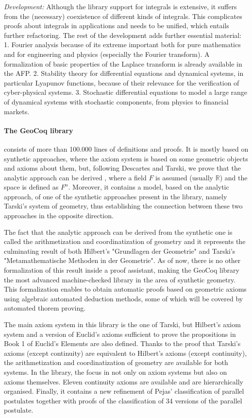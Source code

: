 \emph{Development:}
Although the library support for integrals is extensive, it suffers
from the (necessary) coexistence of different kinds of
integrals. This complicates proofs about integrals in applications and needs
to be unified, which entails further refactoring. The rest of the
development adds further essential material:
1. Fourier analysis because of its extreme important both for pure mathematics and for
engineering and physics (especially the Fourier
transform). A formalization of basic properties of the Laplace transform is already available in the AFP. 2. Stability theory for differential equations and
dynamical systems, in particular Lyapunov functions, because of their
relevance for the verification of cyber-physical systems.
3. Stochastic differential equations to model a large range of
dynamical systems with stochastic components, from physics to financial markets.

\paragraph*{The GeoCoq library}
consists of more than 100.000 lines of definitions and proofs. It is
mostly based on synthetic approaches, where the axiom system is based
on some geometric objects and axioms about them, but, following
Descartes and Tarski, we prove that the analytic approach can be
derived , where a field $F$ is assumed (usually $\mathbb{R}$) and the space is
defined as $F^n$. Moreover, it contains a model, based on the analytic
approach, of one of the synthetic approaches present in the library,
namely Tarski's system of geometry, thus establishing the connection
between these two approaches in the opposite direction.

The fact that the analytic approach can be derived from the synthetic
one is called the arithmetization and coordinatization of geometry and
it represents the culminating result of both Hilbert's "Grundlagen der
Geometrie" and Tarski's "Metamathematische Methoden in der
Geometrie". As of now, there is no other formalization of this result
inside a proof assistant, making the GeoCoq library the most advanced
machine-checked library in the area of synthetic geometry. This
formalization enables to obtain automatic proofs based on geometric
axioms using algebraic automated deduction methods, some of which will
be covered by automated thorem proving.

The main axiom system in this library is the one of Tarski, but
Hilbert's axiom system and a version of Euclid's axioms sufficient to
prove the propositions in Book 1 of Euclid's Elements are also
defined. Thanks to the proof that Tarski's axioms (except continuity)
are equivalent to Hilbert's axioms (except continuity), the
arithmetization and coordinatization of geometry are available for
both systems. In the library, the focus in not only on axiom systems
but also on axioms themselves. Eleven continuity axioms are available
and are hierarchically organised. Finally, it contains a new
refinement of Pejas' classification of parallel postulates together
with proofs of the classification of 34 versions of the parallel
postulate.

